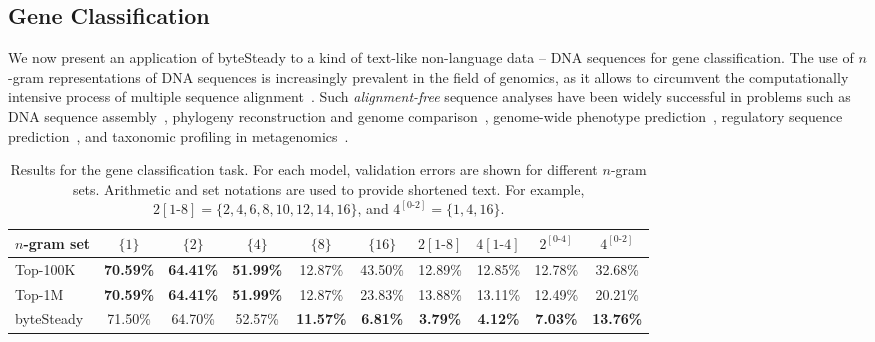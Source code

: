 \documentclass{article}
\begin{document}
\subsection{Gene Classification}

We now present an application of byteSteady to a kind of text-like non-language data -- DNA sequences for gene classification.
The use of $n$-gram representations of DNA sequences is increasingly prevalent in the field of genomics, as it allows to circumvent the computationally intensive process of multiple sequence alignment~\cite{bonham2014alignment}.
Such \textit{alignment-free} sequence analyses have been widely successful in problems such as DNA sequence assembly~\cite{boisvert2010ray, compeau2011apply}, phylogeny reconstruction and genome comparison~\cite{deraspe2017phenetic,leimeister2014kmacs,wen2014k}, genome-wide phenotype prediction~\cite{drouin2019interpretable,nguyen2018developing,davis2016antimicrobial,drouin2016predictive}, regulatory sequence prediction~\cite{ghandi2014enhanced,arvey2012sequence,sharmin2016heterogeneity}, and taxonomic profiling in metagenomics~\cite{raymond2016partial,vervier2016large,boisvert2012raymeta}.

\begin{table}[t]
    \centering
    \caption{Results for the gene classification task. For each model, validation errors are shown for different \(n\)-gram sets. Arithmetic and set notations are used to provide shortened text. For example, \(2[1\text{-}8] = \{2,4,6,8,10,12,14,16\}\), and \(4^{[0\text{-}2]}=\{1,4,16\}\).}
    \addtolength{\tabcolsep}{-3pt}
    \begin{tabular}{lccccccccc}
        \toprule
        \(n\)-gram set & \(\{1\}\) & \(\{2\}\) & \(\{4\}\) & \(\{8\}\) & \(\{16\}\) & \(2 [1\text{-}8]\) & \(4 [1\text{-}4]\) & \(2^{[0\text{-}4]}\) & \(4^{[0\text{-}2]}\)\\
        \midrule
        Top-100K & \textbf{70.59\%} & \textbf{64.41\%} & \textbf{51.99\%} & 12.87\% & 43.50\% & 12.89\% & 12.85\% & 12.78\% & 32.68\% \\
        Top-1M & \textbf{70.59\%} & \textbf{64.41\%} & \textbf{51.99\%} & 12.87\% & 23.83\% & 13.88\% & 13.11\% & 12.49\% & 20.21\% \\
        byteSteady & 71.50\% & 64.70\% & 52.57\% & \textbf{11.57\%} & \textbf{6.81\%} & \textbf{3.79\%} & \textbf{4.12\%} & \textbf{7.03\%} & \textbf{13.76\%} \\
        \bottomrule
    \end{tabular}
    \addtolength{\tabcolsep}{3pt}%
    \label{tab:gene_results}
\end{table}
\end{document}

